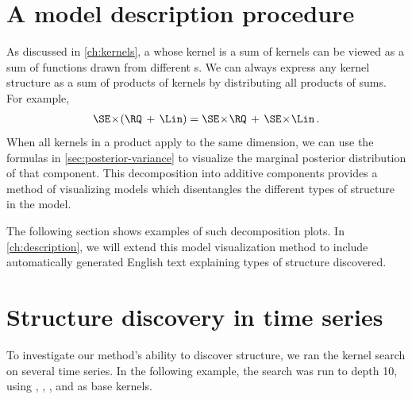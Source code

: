 \section{A model description procedure}

As discussed in \cref{ch:kernels}, a \gp{} whose kernel is a sum of kernels can be viewed as a sum of functions drawn from different \gp{}s.
We can always express any kernel structure as a sum of products of kernels by distributing all products of sums.
For example,
%
\begin{align}
\SE \kerntimes (\RQ \kernplus \Lin) = \SE \kerntimes  \RQ \kernplus \SE \kerntimes \Lin \,.
\end{align}
%
When all kernels in a product apply to the same dimension, we can use the formulas in \cref{sec:posterior-variance} to visualize the marginal posterior distribution of that component.
This decomposition into additive components provides a method of visualizing \gp{} models which disentangles the different types of structure in the model.

The following section shows examples of such decomposition plots.
In \cref{ch:description}, we will extend this model visualization method to include automatically generated English text explaining types of structure discovered.



\section{Structure discovery in time series}
\label{sec:time_series}

To investigate our method's ability to discover structure, we ran the kernel search on several time series.
In the following example, the search was run to depth 10, using \kSE{}, \kRQ{}, \kLin{}, \kPer{} and \kWN{} as base kernels.

